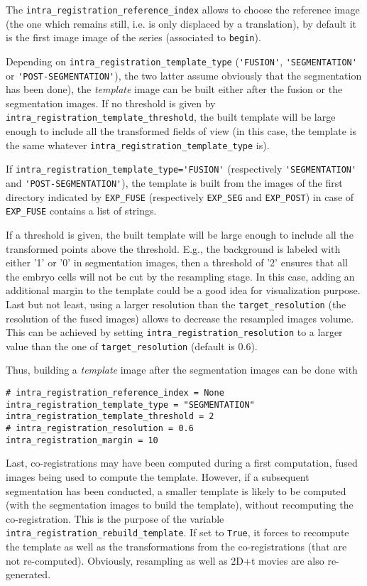 The \verb|intra_registration_reference_index| allows to choose the reference image (the one which remains still, i.e. is only displaced by a translation), by default it is the first image image of the series (associated to \verb|begin|).

Depending on \verb|intra_registration_template_type| (\verb|'FUSION'|,
\verb|'SEGMENTATION'| or \verb|'POST-SEGMENTATION'|), the two latter
assume obviously that the segmentation has been done), the
\textit{template} image can be built either after the fusion or the
segmentation images. If no threshold is given by
\verb|intra_registration_template_threshold|, the built template will
be large enough to include all the transformed fields of view (in this
case, the template is the same whatever
\verb|intra_registration_template_type| is).

If \verb|intra_registration_template_type='FUSION'| (respectively
\verb|'SEGMENTATION'| and \verb|'POST-SEGMENTATION'|),  the template
is built from the images of the first directory indicated by
\texttt{EXP\_FUSE} (respectively
\texttt{EXP\_SEG} and \texttt{EXP\_POST}) in case of
\texttt{EXP\_FUSE} contains a list of strings.

If a threshold is given, the built template will be large enough to
include all the transformed points above the threshold. E.g., the
background is labeled with either '1' or '0' in segmentation images,
then a threshold of '2' ensures that all the embryo cells will not be
cut by the resampling stage.  In this case, adding an additional
margin to the template could be a good idea for visualization
purpose. Last but not least, using a larger resolution than the
\verb|target_resolution| (the resolution of the fused images) allows
to decrease the resampled images volume. This can be achieved by
setting \verb|intra_registration_resolution| to a larger value than
the one of \verb|target_resolution| (default is 0.6).

Thus, building a \textit{template} image after the segmentation images can be done with
\begin{verbatim}
# intra_registration_reference_index = None
intra_registration_template_type = "SEGMENTATION"
intra_registration_template_threshold = 2
# intra_registration_resolution = 0.6
intra_registration_margin = 10
\end{verbatim}

Last, co-registrations may have been computed during a first
computation, fused images being used to compute the template. However,
if  a subsequent segmentation has been conducted, a smaller template
is likely to be computed (with the segmentation images to build the
template), without recomputing the co-registration. This is the
purpose of the variable
\texttt{intra\_registration\_rebuild\_template}.
If set to \texttt{True}, it forces to recompute the template as well
as the transformations from the co-registrations (that are not
re-computed). Obviously, resampling as well as 2D+t movies are also
re-generated.


